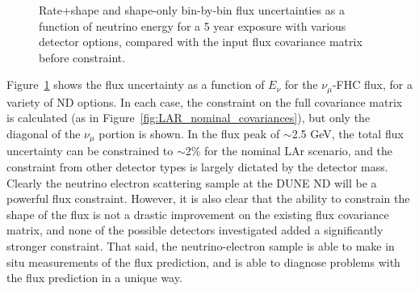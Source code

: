 \begin{figure}[htbp]
  \centering
  \caption{Rate+shape and shape-only bin-by-bin flux uncertainties as a function of neutrino energy for a 5 year exposure with various detector options, compared with the input flux covariance matrix before constraint.}
  \label{fig:nominal_det_constraint}
\end{figure}
Figure~\ref{fig:nominal_det_constraint} shows the flux uncertainty as a function of $E_{\nu}$ for the $\nu_{\mu}$-FHC flux, for a variety of ND options. In each case, the constraint on the full covariance matrix is calculated (as in Figure~\ref{fig:LAR_nominal_covariances}), but only the diagonal of the $\nu_{\mu}$ portion is shown. In the flux peak of $\sim$2.5 GeV, the total flux uncertainty can be constrained to $\sim$2\% for the nominal LAr scenario, and the constraint from other detector types is largely dictated by the detector mass. Clearly the neutrino electron scattering sample at the DUNE ND will be a powerful flux constraint. However, it is also clear that the ability to constrain the shape of the flux is not a drastic improvement on the existing flux covariance matrix, and none of the possible detectors investigated added a significantly stronger constraint. That said, the neutrino-electron sample is able to make in situ measurements of the flux prediction, and is able to diagnose problems with the flux prediction in a unique way.


